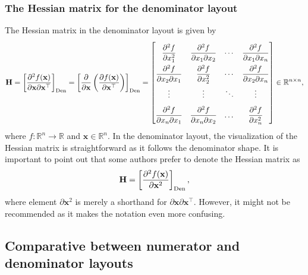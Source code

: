 \subsubsection{The Hessian matrix for the denominator layout}
The Hessian matrix in the denominator layout is given by
\begin{align}
    \label{eq:hessian-eq-denomintor}
    \mathbf{H} = \left[ \dfrac{\partial^{2} f(\mathbf{x})}{\partial\mathbf{x}\partial\mathbf{x}^\top} \right]_{\textnormal{Den}} = \left[ \dfrac{\partial}{\partial \mathbf{x}} \left(\dfrac{\partial f(\mathbf{x})}{\partial \mathbf{x}^\top}\right) \right]_{\textnormal{Den}} = \renewcommand{\arraystretch}{2.2}\begin{bmatrix}
        \dfrac{\partial^{2} f}{\partial x_1^2} & \dfrac{\partial^{2} f}{\partial x_1 \partial x_2} & \cdots & \dfrac{\partial^{2} f}{\partial x_1 \partial x_n} \\
        \dfrac{\partial^{2} f}{\partial x_2 \partial x_1} & \dfrac{\partial^{2} f}{\partial x_2^2} & \cdots & \dfrac{\partial^{2} f}{\partial x_2 \partial x_n} \\
        \vdots & \vdots & \ddots & \vdots \\
        \dfrac{\partial^{2} f}{\partial x_n \partial x_1} & \dfrac{\partial^{2} f}{\partial x_n \partial x_2} & \dots & \dfrac{\partial^{2} f}{\partial x_n^2}
    \end{bmatrix} \in \mathbb{R}^{n \times n},
\end{align}
where \(f: \mathbb{R}^{n} \rightarrow \mathbb{R}\) and \(\mathbf{x} \in \mathbb{R}^{n}\). In the denominator layout, the visualization of the Hessian matrix is straightforward as it follows the denominator shape. It is important to point out that some authors \cite{diniz1997adaptive,haykinAdaptiveFilterTheory2002} prefer to denote the Hessian matrix as
\begin{align}
    \mathbf{H} = \left[ \dfrac{\partial^{2} f(\mathbf{x})}{\partial \mathbf{x}^2} \right]_{\textnormal{Den}},
\end{align}
where element \(\partial\mathbf{x}^2\) is merely a shorthand for \(\partial\mathbf{x}\partial\mathbf{x}^\top\). However, it might not be recommended as it makes the notation even more confusing.

\subsection{Comparative between numerator and denominator layouts}


